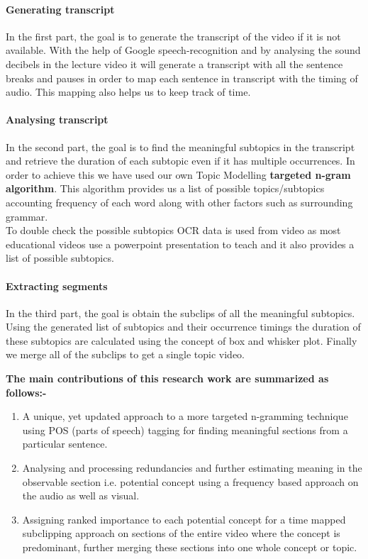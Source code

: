 \documentclass[conference]{IEEEtran}
\begin{document}
\paragraph{Generating transcript}
In the first part, the goal is to generate the transcript of the video if it is not available. With the help of Google speech-recognition and by analysing the sound decibels in the lecture video it will generate a transcript with all the sentence breaks and pauses in order to map each sentence in transcript with the timing of audio. This mapping also helps us to keep track of time.

\paragraph{Analysing transcript}
In the second part, the goal is to find the meaningful subtopics in the transcript and retrieve the duration of each subtopic even if it has multiple occurrences. In order to achieve this we have used our own Topic Modelling \textbf{targeted n-gram algorithm}. This algorithm provides us a list of possible topics/subtopics accounting frequency of each word along with other factors such as surrounding grammar.\\
\indent To double check the possible subtopics OCR data is used from video as most educational videos use a powerpoint presentation to teach and it also provides a list of possible subtopics.

\paragraph{Extracting segments}
In the third part, the goal is obtain the subclips of all the meaningful subtopics. Using the generated list of subtopics and their occurrence timings the duration of these subtopics are calculated using the concept of box and whisker plot. Finally we merge all of the subclips to get a single topic video.

\textbf{The main contributions of this research work are summarized as follows:-}
\begin{enumerate}
\item A unique, yet updated approach to a more targeted n-gramming technique using POS (parts of speech) tagging for finding meaningful sections from a particular sentence.
\item Analysing and processing redundancies and further estimating meaning in the observable section i.e. potential concept using a frequency based approach on the audio as well as visual.
\item Assigning ranked importance to each potential concept for a time mapped subclipping approach on sections of the entire video where the concept is predominant, further merging these sections into one whole concept or topic.
\end{enumerate}
\end{document}
